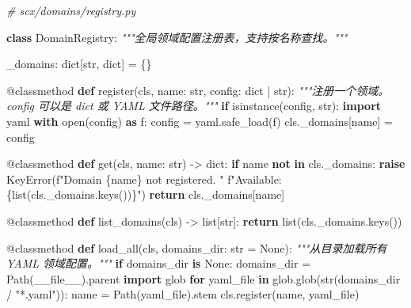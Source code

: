 \documentclass[
  12pt,
]{ctexart}
\newenvironment{Shaded}{}{}
\newcommand{\AttributeTok}[1]{\textcolor[rgb]{0.49,0.56,0.16}{#1}}
\newcommand{\BuiltInTok}[1]{\textcolor[rgb]{0.00,0.50,0.00}{#1}}
\newcommand{\CommentTok}[1]{\textcolor[rgb]{0.38,0.63,0.69}{\textit{#1}}}
\newcommand{\ControlFlowTok}[1]{\textcolor[rgb]{0.00,0.44,0.13}{\textbf{#1}}}
\newcommand{\ImportTok}[1]{\textcolor[rgb]{0.00,0.50,0.00}{\textbf{#1}}}
\newcommand{\KeywordTok}[1]{\textcolor[rgb]{0.00,0.44,0.13}{\textbf{#1}}}
\newcommand{\NormalTok}[1]{#1}
\newcommand{\OperatorTok}[1]{\textcolor[rgb]{0.40,0.40,0.40}{#1}}
\newcommand{\PreprocessorTok}[1]{\textcolor[rgb]{0.74,0.48,0.00}{#1}}
\newcommand{\SpecialCharTok}[1]{\textcolor[rgb]{0.25,0.44,0.63}{#1}}
\newcommand{\SpecialStringTok}[1]{\textcolor[rgb]{0.73,0.40,0.53}{#1}}
\newcommand{\StringTok}[1]{\textcolor[rgb]{0.25,0.44,0.63}{#1}}
\newcommand{\VariableTok}[1]{\textcolor[rgb]{0.10,0.09,0.49}{#1}}
\begin{document}
\begin{Shaded}
\begin{Highlighting}[]
\CommentTok{\# scx/domains/registry.py}

\KeywordTok{class}\NormalTok{ DomainRegistry:}
    \CommentTok{"""全局领域配置注册表，支持按名称查找。"""}

\NormalTok{    \_domains: }\BuiltInTok{dict}\NormalTok{[}\BuiltInTok{str}\NormalTok{, }\BuiltInTok{dict}\NormalTok{] }\OperatorTok{=}\NormalTok{ \{\}}

    \AttributeTok{@classmethod}
    \KeywordTok{def}\NormalTok{ register(cls, name: }\BuiltInTok{str}\NormalTok{, config: }\BuiltInTok{dict} \OperatorTok{|} \BuiltInTok{str}\NormalTok{):}
        \CommentTok{"""注册一个领域。config 可以是 dict 或 YAML 文件路径。"""}
        \ControlFlowTok{if} \BuiltInTok{isinstance}\NormalTok{(config, }\BuiltInTok{str}\NormalTok{):}
            \ImportTok{import}\NormalTok{ yaml}
            \ControlFlowTok{with} \BuiltInTok{open}\NormalTok{(config) }\ImportTok{as}\NormalTok{ f:}
\NormalTok{                config }\OperatorTok{=}\NormalTok{ yaml.safe\_load(f)}
\NormalTok{        cls.\_domains[name] }\OperatorTok{=}\NormalTok{ config}

    \AttributeTok{@classmethod}
    \KeywordTok{def}\NormalTok{ get(cls, name: }\BuiltInTok{str}\NormalTok{) }\OperatorTok{{-}\textgreater{}} \BuiltInTok{dict}\NormalTok{:}
        \ControlFlowTok{if}\NormalTok{ name }\KeywordTok{not} \KeywordTok{in}\NormalTok{ cls.\_domains:}
            \ControlFlowTok{raise} \PreprocessorTok{KeyError}\NormalTok{(}\SpecialStringTok{f"Domain \textquotesingle{}}\SpecialCharTok{\{}\NormalTok{name}\SpecialCharTok{\}}\SpecialStringTok{\textquotesingle{} not registered. "}
                           \SpecialStringTok{f"Available: }\SpecialCharTok{\{}\BuiltInTok{list}\NormalTok{(cls.\_domains.keys())}\SpecialCharTok{\}}\SpecialStringTok{"}\NormalTok{)}
        \ControlFlowTok{return}\NormalTok{ cls.\_domains[name]}

    \AttributeTok{@classmethod}
    \KeywordTok{def}\NormalTok{ list\_domains(cls) }\OperatorTok{{-}\textgreater{}} \BuiltInTok{list}\NormalTok{[}\BuiltInTok{str}\NormalTok{]:}
        \ControlFlowTok{return} \BuiltInTok{list}\NormalTok{(cls.\_domains.keys())}

    \AttributeTok{@classmethod}
    \KeywordTok{def}\NormalTok{ load\_all(cls, domains\_dir: }\BuiltInTok{str} \OperatorTok{=} \VariableTok{None}\NormalTok{):}
        \CommentTok{"""从目录加载所有 YAML 领域配置。"""}
        \ControlFlowTok{if}\NormalTok{ domains\_dir }\KeywordTok{is} \VariableTok{None}\NormalTok{:}
\NormalTok{            domains\_dir }\OperatorTok{=}\NormalTok{ Path(}\VariableTok{\_\_file\_\_}\NormalTok{).parent}
        \ImportTok{import}\NormalTok{ glob}
        \ControlFlowTok{for}\NormalTok{ yaml\_file }\KeywordTok{in}\NormalTok{ glob.glob(}\BuiltInTok{str}\NormalTok{(domains\_dir }\OperatorTok{/} \StringTok{"*.yaml"}\NormalTok{)):}
\NormalTok{            name }\OperatorTok{=}\NormalTok{ Path(yaml\_file).stem}
\NormalTok{            cls.register(name, yaml\_file)}


\end{Highlighting}
\end{Shaded}
\end{document}
